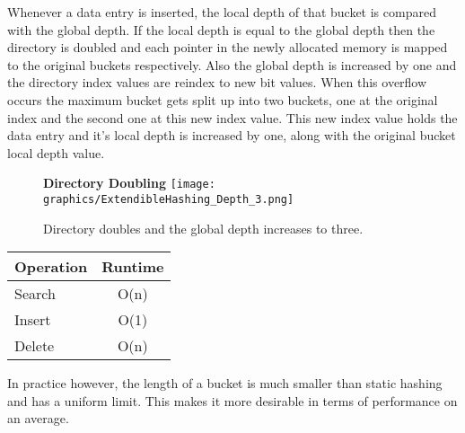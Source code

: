 \documentclass[letterpaper, 12pt]{article}
\begin{document}
Whenever a data entry is inserted, the local depth of that bucket is compared with the global depth. If the local depth
is equal to the global depth then the directory is doubled and each pointer in the newly allocated memory is mapped to the
original buckets respectively. Also the global depth is increased by one and the directory index values are reindex to new
bit values. When this overflow occurs the maximum bucket gets split up into two buckets, one at the original index and the
second one at this new index value. This new index value holds the data entry and it's local depth is increased by one, along with
the original bucket local depth value.

\begin{figure}
  \textbf{Directory Doubling}
  \texttt{[image: graphics/ExtendibleHashing\_Depth\_3.png]}
  \caption{Directory doubles and the global depth increases to three.}
\end{figure}

\begin{center}
\begin{tabular}{l | c }
  \hline
  Operation & Runtime \\ \hline \hline
  Search & O(n) \\ \hline
  Insert & O(1) \\ \hline
  Delete & O(n) \\ \hline
\end{tabular}
\end{center}

In practice however, the length of a bucket is much smaller than static hashing and has
a uniform limit. This makes it more desirable in terms of performance on an average.

\end{document}
